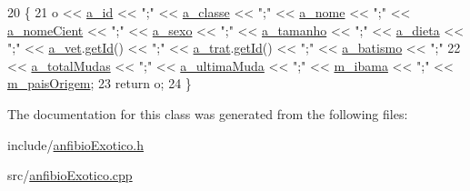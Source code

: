 \begin{DoxyCode}
20 \{
21     o << \hyperlink{classAnimal_a1eab12d1133a739dc0fea720cf6cc927}{a\_id} << \textcolor{stringliteral}{";"} << \hyperlink{classAnimal_a1f32b4455559489b5f5dce71913a6f8f}{a\_classe} << \textcolor{stringliteral}{";"} << \hyperlink{classAnimal_ad815bbe345d7c5274858ac8ccb24bc52}{a\_nome} << \textcolor{stringliteral}{";"} << 
      \hyperlink{classAnimal_af2ae0fc23b0eaf3edaee4579f6199dfc}{a\_nomeCient} << \textcolor{stringliteral}{";"} << \hyperlink{classAnimal_af2b1c520d145f82af7a5a88bb4271a0d}{a\_sexo} << \textcolor{stringliteral}{";"} << \hyperlink{classAnimal_a72366b060dfdbc0dd074fbe41decfcc2}{a\_tamanho} << \textcolor{stringliteral}{";"} << 
      \hyperlink{classAnimal_a32088524517a531af269e3ec04275135}{a\_dieta} << \textcolor{stringliteral}{";"} << \hyperlink{classAnimal_a12ce5681957e27dae674cbbde7fb1e4f}{a\_vet}.\hyperlink{classFuncionario_a0288286a907e587b7ab75d6c23354a06}{getId}() << \textcolor{stringliteral}{";"} << \hyperlink{classAnimal_a19fbf607b29b06a86f598dd1ffb8c712}{a\_trat}.\hyperlink{classFuncionario_a0288286a907e587b7ab75d6c23354a06}{getId}() << \textcolor{stringliteral}{";"} << 
      \hyperlink{classAnimal_a4e308163c5b3d82e546fb39b399bcb71}{a\_batismo} << \textcolor{stringliteral}{";"}
22     << \hyperlink{classAnfibio_a322af56e1ff61753e6abfe2693d29504}{a\_totalMudas} << \textcolor{stringliteral}{";"} << \hyperlink{classAnfibio_a674f19d430b4781216fac1fee2567771}{a\_ultimaMuda} << \textcolor{stringliteral}{";"} << 
      \hyperlink{classAnimalSilvestre_a4c92c625318b23e550b8bb24fb934d14}{m\_ibama} << \textcolor{stringliteral}{";"} << \hyperlink{classExotico_a4ac7dec507f3420f4c96318c22ec6f36}{m\_paisOrigem};
23     \textcolor{keywordflow}{return} o;
24 \}\end{DoxyCode}


The documentation for this class was generated from the following files\+:\begin{DoxyCompactItemize}
\item 
include/\hyperlink{anfibioExotico_8h}{anfibio\+Exotico.\+h}\item 
src/\hyperlink{anfibioExotico_8cpp}{anfibio\+Exotico.\+cpp}\end{DoxyCompactItemize}

